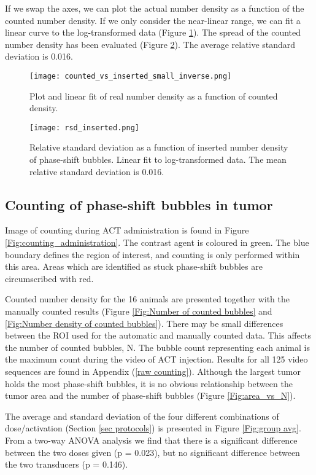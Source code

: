 If we swap the axes, we can plot the actual number density as a function of the counted number density. If we only consider the near-linear range, we can fit a linear curve to the log-transformed data (Figure \ref{Fig:counted_vs_inserted_inverse}). The spread of the counted number density has been evaluated (Figure \ref{Fig:rsd}). The average relative standard deviation is 0.016.

\begin{figure}[h]
  \centering
  \texttt{[image: counted\_vs\_inserted\_small\_inverse.png]}
  \caption{Plot and linear fit of real number density as a function of counted density.}
  \label{Fig:counted_vs_inserted_inverse}
\end{figure}

\begin{figure}[h]
	\centering
	\texttt{[image: rsd\_inserted.png]}
	\caption{Relative standard deviation as a function of inserted number density of phase-shift bubbles. Linear fit to log-transformed data. The mean relative standard deviation is 0.016.}
	\label{Fig:rsd}
\end{figure}


\subsection{Counting of phase-shift bubbles in tumor}
Image of counting during ACT\texttrademark{} administration is found in Figure \ref{Fig:counting_administration}. The contrast agent is coloured in green. The blue boundary defines the region of interest, and counting is only performed within this area. Areas which are identified as stuck phase-shift bubbles are circumscribed with red.

Counted number density for the 16 animals are presented together with the manually counted results (Figure \ref{Fig:Number of counted bubbles} and \ref{Fig:Number density of counted bubbles}). There may be small differences between the ROI used for the automatic and manually counted data. This affects the number of counted bubbles, N. The bubble count representing each animal is the maximum count during the video of ACT\texttrademark{} injection. Results for all 125 video sequences are found in Appendix (\ref{raw counting}). Although the largest tumor holds the most phase-shift bubbles, it is no obvious relationship between the tumor area and the number of phase-shift bubbles (Figure \ref{Fig:area_vs_N}).

The average and standard deviation of the four different combinations of dose/activation (Section \ref{sec protocols}) is presented in Figure \ref{Fig:group avg}. From a two-way ANOVA analysis we find that there is a significant difference between the two doses given (p = 0.023), but no significant difference between the two transducers (p = 0.146).


